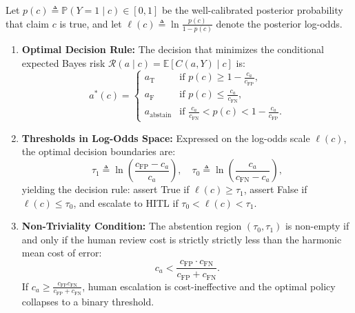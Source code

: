 \begin{theorem}
\label{thm:chow_rule}
Let $p(c) \triangleq \mathbb{P}(Y = 1 \mid c) \in [0, 1]$ be the well-calibrated posterior probability that claim $c$ is true, and let $\ell(c) \triangleq \ln \frac{p(c)}{1 - p(c)}$ denote the posterior log-odds.
\begin{enumerate}
    \item \textbf{Optimal Decision Rule:} The decision that minimizes the conditional expected Bayes risk $\mathcal{R}(a \mid c) = \mathbb{E}[C(a, Y) \mid c]$ is:
    \begin{equation}
    \label{eq:chow_prob_rule}
    a^*(c) = \begin{cases}
    a_{\text{T}} & \text{if } p(c) \ge 1 - \frac{c_a}{c_{\text{FP}}}, \\
    a_{\text{F}} & \text{if } p(c) \le \frac{c_a}{c_{\text{FN}}}, \\
    a_{\text{abstain}} & \text{if } \frac{c_a}{c_{\text{FN}}} < p(c) < 1 - \frac{c_a}{c_{\text{FP}}}.
    \end{cases}
    \end{equation}

    \item \textbf{Thresholds in Log-Odds Space:} Expressed on the log-odds scale $\ell(c)$, the optimal decision boundaries are:
    \begin{equation}
    \label{eq:chow_logodds_rule}
    \tau_1 \triangleq \ln \left( \frac{c_{\text{FP}} - c_a}{c_a} \right), \quad \tau_0 \triangleq \ln \left( \frac{c_a}{c_{\text{FN}} - c_a} \right),
    \end{equation}
    yielding the decision rule: assert True if $\ell(c) \ge \tau_1$, assert False if $\ell(c) \le \tau_0$, and escalate to HITL if $\tau_0 < \ell(c) < \tau_1$.

    \item \textbf{Non-Triviality Condition:} The abstention region $(\tau_0, \tau_1)$ is non-empty if and only if the human review cost is strictly strictly less than the harmonic mean cost of error:
    \begin{equation}
    \label{eq:nontrivial_abstain}
    c_a < \frac{c_{\text{FP}} \cdot c_{\text{FN}}}{c_{\text{FP}} + c_{\text{FN}}}.
    \end{equation}
    If $c_a \ge \frac{c_{\text{FP}} c_{\text{FN}}}{c_{\text{FP}} + c_{\text{FN}}}$, human escalation is cost-ineffective and the optimal policy collapses to a binary threshold.


\end{enumerate}
\end{theorem}
